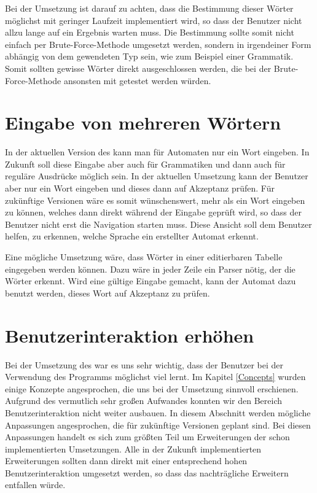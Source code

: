 Bei der Umsetzung ist darauf zu achten, dass die Bestimmung dieser Wörter
möglichst mit geringer Laufzeit implementiert wird, so dass der Benutzer nicht
allzu lange auf ein Ergebnis warten muss. Die Bestimmung sollte somit nicht
einfach per Brute-Force-Methode umgesetzt werden, sondern in irgendeiner Form
abhängig von dem gewendeten Typ sein, wie zum Beispiel einer Grammatik. Somit
sollten gewisse Wörter direkt ausgeschlossen werden, die bei der
Brute-Force-Methode ansonsten mit getestet werden würden.\vspace{10pt}


\section{Eingabe von mehreren Wörtern}\label{PerspectiveMultiplyWordInput}

In der aktuellen Version des \gtitools kann man für Automaten nur ein Wort
eingeben. In Zukunft soll diese Eingabe aber auch für Grammatiken und dann auch
für reguläre Ausdrücke möglich sein. In der aktuellen Umsetzung kann der Benutzer
aber nur ein Wort eingeben und dieses dann auf Akzeptanz prüfen. Für zukünftige
Versionen wäre es somit wünschenswert, mehr als ein Wort eingeben zu können,
welches dann direkt während der Eingabe geprüft wird, so dass der Benutzer
nicht erst die Navigation starten muss. Diese Ansicht soll dem Benutzer helfen,
zu erkennen, welche Sprache ein erstellter Automat erkennt.\vspace{10pt}

Eine mögliche Umsetzung wäre, dass Wörter in einer editierbaren Tabelle
eingegeben werden können. Dazu wäre in jeder Zeile ein Parser nötig, der die
Wörter erkennt. Wird eine gültige Eingabe gemacht, kann der Automat dazu
benutzt werden, dieses Wort auf Akzeptanz zu prüfen.\vspace{10pt}


\section{Benutzerinteraktion erhöhen}\label{PerspectiveInteraction}

Bei der Umsetzung des \gtitools war es uns sehr wichtig, dass der Benutzer bei
der Verwendung des Programms möglichst viel lernt. Im Kapitel \ref{Concepts}
wurden einige Konzepte angesprochen, die uns bei der Umsetzung sinnvoll
erschienen. Aufgrund des vermutlich sehr großen Aufwandes konnten wir den Bereich
Benutzerinteraktion nicht weiter ausbauen. In diesem Abschnitt werden mögliche
Anpassungen angesprochen, die für zukünftige \gtitool Versionen geplant sind. Bei
diesen Anpassungen handelt es sich zum größten Teil um Erweiterungen der schon
implementierten Umsetzungen. Alle in der Zukunft implementierten Erweiterungen
sollten dann direkt mit einer entsprechend hohen Benutzerinteraktion umgesetzt
werden, so dass das nachträgliche Erweitern entfallen würde.\vspace{10pt}


